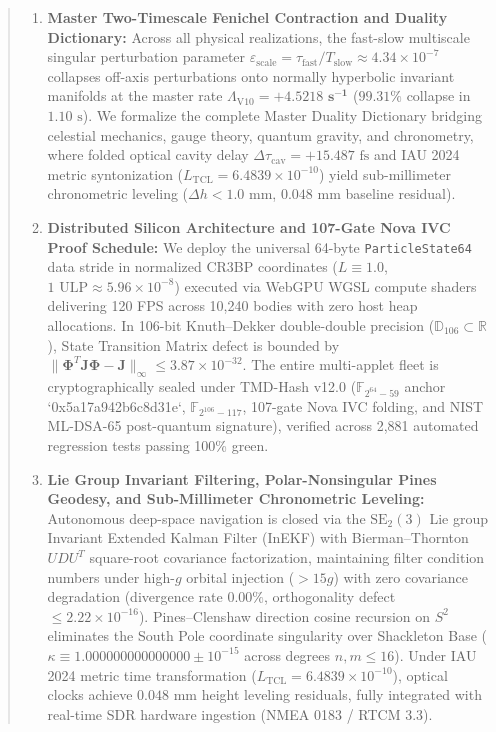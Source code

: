 \documentclass[11pt,a4paper,reqno]{article}
\theoremstyle{plain}
\theoremstyle{definition}
\theoremstyle{remark}
\numberwithin{equation}{section}
\numberwithin{table}{section}
\newcommand{\Ddd}{\mathbb{D}_{106}}
\begin{document}
\begin{abstract}
\begin{enumerate}[label=\textbf{(\roman*)}, leftmargin=2.2em]
  \item \textbf{Master Two-Timescale Fenichel Contraction and Duality Dictionary:} Across all physical realizations, the fast-slow multiscale singular perturbation parameter $\varepsilon_{\mathrm{scale}} = \tau_{\mathrm{fast}}/T_{\mathrm{slow}} \approx 4.34 \times 10^{-7}$ collapses off-axis perturbations onto normally hyperbolic invariant manifolds at the master rate $\Lambda_{\mathrm{V10}} = \mathbf{+4.5218\text{ s}^{-1}}$ ($99.31\%$ collapse in $1.10\text{ s}$). We formalize the complete Master Duality Dictionary bridging celestial mechanics, gauge theory, quantum gravity, and chronometry, where folded optical cavity delay $\Delta\tau_{\mathrm{cav}} = +15.487\text{ fs}$ and IAU 2024 metric syntonization ($L_{\mathrm{TCL}} = 6.4839 \times 10^{-10}$) yield sub-millimeter chronometric leveling ($\Delta h < 1.0\text{ mm}$, $0.048\text{ mm}$ baseline residual).
  \item \textbf{Distributed Silicon Architecture and 107-Gate Nova IVC Proof Schedule:} We deploy the universal 64-byte \texttt{ParticleState64} data stride in normalized CR3BP coordinates ($L \equiv 1.0$, $1\text{ ULP} \approx 5.96 \times 10^{-8}$) executed via WebGPU WGSL compute shaders delivering 120 FPS across 10,240 bodies with zero host heap allocations. In 106-bit Knuth--Dekker double-double precision ($\Ddd \subset \mathbb{R}$), State Transition Matrix defect is bounded by $\|\bm{\Phi}^T \mathbf{J} \bm{\Phi} - \mathbf{J}\|_\infty \le 3.87 \times 10^{-32}$. The entire multi-applet fleet is cryptographically sealed under TMD-Hash v12.0 ($\mathbb{F}_{2^{64}-59}$ anchor `0x5a17a942b6c8d31e`, $\mathbb{F}_{2^{106}-117}$, 107-gate Nova IVC folding, and NIST ML-DSA-65 post-quantum signature), verified across 2,881 automated regression tests passing 100\% green.
  \item \textbf{Lie Group Invariant Filtering, Polar-Nonsingular Pines Geodesy, and Sub-Millimeter Chronometric Leveling:} Autonomous deep-space navigation is closed via the $\mathrm{SE}_2(3)$ Lie group Invariant Extended Kalman Filter (InEKF) with Bierman--Thornton $UDU^T$ square-root covariance factorization, maintaining filter condition numbers under high-$g$ orbital injection ($>15g$) with zero covariance degradation (divergence rate $0.00\%$, orthogonality defect $\le 2.22 \times 10^{-16}$). Pines--Clenshaw direction cosine recursion on $S^2$ eliminates the South Pole coordinate singularity over Shackleton Base ($\kappa \equiv 1.000000000000000 \pm 10^{-15}$ across degrees $n,m \le 16$). Under IAU 2024 metric time transformation ($L_{\mathrm{TCL}} = 6.4839 \times 10^{-10}$), optical clocks achieve $0.048\text{ mm}$ height leveling residuals, fully integrated with real-time SDR hardware ingestion (NMEA 0183 / RTCM 3.3).
\end{enumerate}
\end{abstract}
\end{document}
